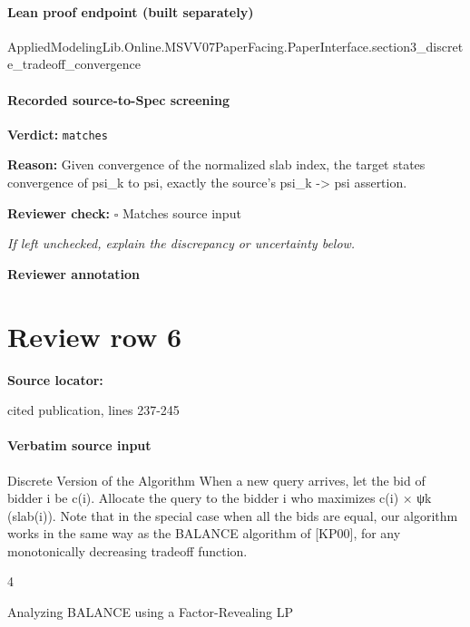 \documentclass[10pt]{article}
\newcommand{\reviewerbox}{%
  \par\noindent\fbox{\parbox{0.96\linewidth}{\rule{0pt}{0.38in}}}\par
}
\newcommand{\reviewmatch}[1]{%
  \par\noindent\textbf{Reviewer check:} $\square$\; #1\par
  \noindent\emph{If left unchecked, explain the discrepancy or uncertainty below.}\par
}
\begin{document}
\paragraph{Lean proof endpoint (built separately)}\begin{ReviewVerbatim}
AppliedModelingLib.Online.MSVV07PaperFacing.PaperInterface.section3_discrete_tradeoff_convergence
\end{ReviewVerbatim}

\paragraph{Recorded source-to-Spec screening}
\textbf{Verdict:} \texttt{matches}
\\
{\raggedright
\textbf{Reason:} Given convergence of the normalized slab index, the target states convergence of psi\_\allowbreak{}k to psi, exactly the source's psi\_\allowbreak{}k -\allowbreak{}> psi assertion.\allowbreak{}
\par}
\reviewmatch{Matches source input}
\noindent\textbf{Reviewer annotation}\par
\reviewerbox
\clearpage
\hypertarget{source-claim-598344e99902b4ae}{}
\section*{Review row 6}
\textbf{Source locator:} {\footnotesize\raggedright cited publication, lines 237-\allowbreak{}245\par}
\paragraph{Verbatim source input}
\begin{ReviewVerbatim}
Discrete Version of the Algorithm
When a new query arrives, let the bid of bidder i be c(i). Allocate the query to the
bidder i who maximizes c(i) × ψk (slab(i)).
Note that in the special case when all the bids are equal, our algorithm works in the same way
as the BALANCE algorithm of [KP00], for any monotonically decreasing tradeoff function.

4

Analyzing BALANCE using a Factor-Revealing LP
\end{ReviewVerbatim}
\end{document}
